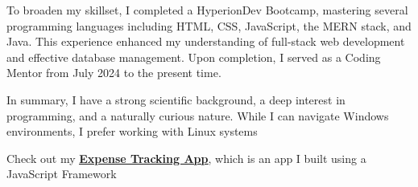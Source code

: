 \documentclass[a4paper,10pt]{article}
\begin{document}
To broaden my skillset, I completed a HyperionDev Bootcamp, mastering several programming languages including HTML, CSS, JavaScript, the MERN stack, and Java. This experience enhanced my understanding of full-stack web development and effective database management. Upon completion, I served as a Coding Mentor from July 2024 to the present time.

In summary, I have a strong scientific background, a deep interest in programming, and a naturally curious nature. While I can navigate Windows environments, I prefer working with Linux systems {\faLinux}{\vspace*{2pt}}

\begin{center}	
{\fontsize{11}{10}\selectfont\textcolor{burnt}{\faHandPointRight} Check out my \href{https://expense-tracker-five-sepia.vercel.app/}{\textbf{\underline{Expense Tracking App}}}, which is an app I built using a JavaScript Framework \textcolor{burnt}{\faHandPointLeft}}
\end{center}
\end{document}
